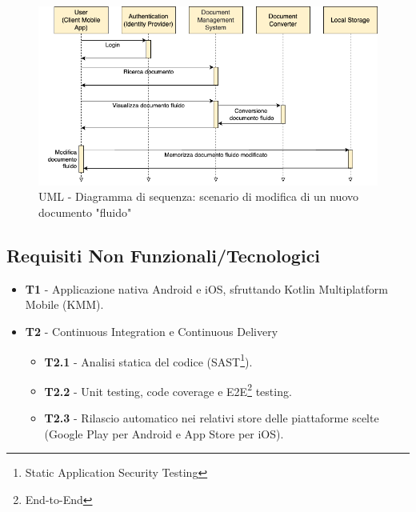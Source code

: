 \begin{figure}[H]
\centering
\includegraphics[width=1\textwidth]{img/tesi-2-Use-case2.drawio.png}
\caption{UML - Diagramma di sequenza: scenario di modifica di un nuovo documento "fluido"}
\end{figure}

\subsection{Requisiti Non Funzionali/Tecnologici}
\begin{itemize}
    \item \textbf{T1} - Applicazione nativa Android e iOS, sfruttando Kotlin Multiplatform Mobile (KMM).
    \item \textbf{T2} - Continuous Integration e Continuous Delivery
    \begin{itemize}
        \item \textbf{T2.1} - Analisi statica del codice (SAST\footnote{Static Application Security Testing}).
        \item \textbf{T2.2} - Unit testing, code coverage e E2E\footnote{End-to-End} testing.
        \item \textbf{T2.3} - Rilascio automatico nei relativi store delle piattaforme scelte (Google Play per Android e App Store per iOS).
    \end{itemize}
\end{itemize}

